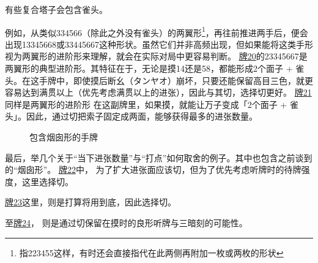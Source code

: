 有些复合塔子会包含雀头。

例如，从类似334566（除此之外没有雀头）的两翼形\footnote{指223455这样，有时还会直接指代在此两侧再附加一枚或两枚的形状}，再往前推进两手后，便会出现13345668或33445667这种形状。虽然它们并非高频出现，但如果能将这类手形视为两翼形的进阶形来理解，就会在实际对局中更容易判断。
\hyperref[lec7:pai20-21]{牌20}的23345667是两翼形的典型进阶形。其特征在于，无论是摸14还是58，都能形成2个面子 + 雀头。在这手牌中，即使摸后断幺（タンヤオ）崩坏，只要还能保留高目三色，就更容易达到满贯以上（优先考虑满贯以上的进张），因此与其切，选择切更好。
\hyperref[lec7:pai20-21]{牌21}同样是两翼形的进阶形
在这副牌里，如果摸，就能让万子变成「2个面子 + 雀头」。因此，通过切把索子固定成两面，能够获得最多的进张数量。

\par\bigskip
\begin{figure}[h]
    \caption{包含烟囱形的手牌}
    \label{lec7:pai22-24}
    \par\bigskip
    \par\bigskip
\end{figure}
最后，举几个关于“当下进张数量”与“打点”如何取舍的例子。其中也包含之前谈到的“烟囱形”。
\hyperref[lec7:pai22-24]{牌22}中，
为了扩大进张面应该切，但为了优先考虑听牌时的待牌强度，这里选择切。

\hyperref[lec7:pai22-24]{牌23}这里，则是打算将用到底，因此选择切。

至\hyperref[lec7:pai22-24]{牌24}，
则是通过切保留在摸时的良形听牌与三暗刻的可能性。


